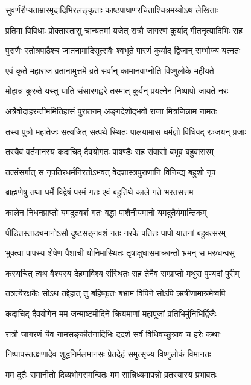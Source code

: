 \twolineshloka
{सुवर्णरौप्यताम्रारमृदादिभिरलङ्कृताः}
{काष्ठपाषाणरचिताश्चित्रमय्योऽथ लेखिताः}%

\twolineshloka
{प्रतिमा विविधाः प्रोक्तास्तासु चान्यतमां यजेत्}
{रात्रौ जागरणं कुर्याद् गीतनृत्यादिभिः सह}%

\twolineshloka
{पुराणैः स्तोत्रपाठैश्च जातनामादिसूत्सवैः}
{श्वभूते पारणं कुर्याद् द्विजान् सम्भोज्य यत्नतः}%

\twolineshloka
{एवं कृते महाराज व्रतानामुत्तमे व्रते}
{सर्वान् कामानवाप्नोति विष्णुलोके महीयते}%

\twolineshloka
{मोहान्न कुरुते यस्तु याति संसारगह्वरे}
{तस्मात् कुर्वन् प्रयत्नेन निष्पापो जायते नरः}%

\twolineshloka
{अत्रैवोदाहरन्तीममितिहासं पुरातनम्}
{अङ्गदेशोद्भवो राजा मित्रजिन्नाम नामतः}%

\twolineshloka
{तस्य पुत्रो महातेजः सत्यजित् सत्पथे स्थितः}
{पालयामास धर्मज्ञो विधिवद् रञ्जयन् प्रजाः}%

\twolineshloka
{तस्यैवं वर्तमानस्य कदाचिद् दैवयोगतः}
{पाषण्डैः सह संवासो बभूव बहुवासरम्}%

\twolineshloka
{तत्संसर्गात् स नृपतिरधर्मनिरतोऽभवत्}
{वेदशास्त्रपुराणानि विनिन्द्य बहुशो नृप}%

\twolineshloka
{ब्राह्मणेषु तथा धर्मे विद्वेषं परमं गतः}
{एवं बहुतिथे काले गते भरतसत्तम}%

\twolineshloka
{कालेन निधनप्राप्तो यमदूतवशं गतः}
{बद्धा पाशैर्नीयमानो यमदूतैर्यमान्तिकम्}%

\twolineshloka
{पीडितस्ताड्यमानोऽसौ दुष्टसङ्गवशं गतः}
{नरके पतितः पापो यातनां बहुवत्सरम्}%

\twolineshloka
{भुक्त्वा पापस्य शेषेण पैशाची योनिमास्थितः}
{तृषाक्षुधासमाक्रान्तो भ्रमन् स मरुधन्वसु}%

\twolineshloka
{कस्यचित् त्वथ वैश्यस्य देहमाविश्य संस्थितः}
{सह तेनैव सम्प्राप्तो मथुरा पुण्यदां पुरीम्}%

\twolineshloka
{तत्रत्यैरक्षकैः सोऽथ तद्देहात् तु बहिष्कृतः}
{बभ्राम विपिने सोऽपि ऋषीणामाश्रमेष्वपि}%

\twolineshloka
{कदाचिद् दैवयोगेन मम जन्माष्टमीदिने}
{क्रियमाणां महापूजां व्रतिभिर्मुनिभिर्द्विजैः}%

\twolineshloka
{रात्रौ जागरणं चैव नामसङ्कीर्तनादिभिः}
{ददर्श सर्वं विधिवच्छुश्राव च हरेः कथाः}%

\twolineshloka
{निष्पापस्तत्क्षणादेव शुद्धनिर्मलमानसः}
{प्रेतदेहं समुत्सृज्य विष्णुलोकं विमानतः}%

\twolineshloka
{मम दूतैः समानीतो दिव्यभोगसमन्वितः}
{मम सान्निध्यमापन्नो व्रतस्यास्य प्रभावतः}%

